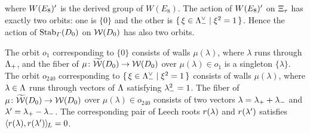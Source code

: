 \documentclass{amsart} %
\begin{document}
where $W(E_8)^{\prime}$ is the derived group of $W(E_8)$.
The action of $W(E_8)^{\prime}$ on $\Xi_{\tau}$ has exactly two orbits:
one is 
$\{0\}$ and the other is $\{\,{\xi\in \Lambda_{-}^{\vee}}\mid {\xi^2=1} \,\}$.
Hence the action of $\operatorname{Stab}_{\varGamma}(D_0)$ on $\mathord{\mathcal{W}}(D_0)$ 
has also two orbits.
\par
The orbit $o_1$ corresponding to $\{0\}$
consists of walls $\mu(\lambda)$,
where $\lambda$ runs through $\Lambda_{+}$,
and the fiber of $\mu\colon \widetilde{\mathord{\mathcal{W}}}(D_0)\to\mathord{\mathcal{W}}(D_0)$ 
over $\mu(\lambda)\in o_1$ is a singleton $\{\lambda\}$.
The orbit $o_{240}$ corresponding to $\{\,{\xi\in \Lambda_{-}^{\vee}}\mid {\xi^2=1} \,\}$
consists of walls $\mu(\lambda)$,
where $\lambda\in \Lambda$ runs through
vectors of $\Lambda$ satisfying ${\lambda}_{-}^2=1$.
The fiber of $\mu\colon \widetilde{\mathord{\mathcal{W}}}(D_0)\to\mathord{\mathcal{W}}(D_0)$ 
over $\mu(\lambda)\in o_{240}$ consists 
of two vectors
$\lambda={\lambda}_{+}+{\lambda}_{-}$ and $\lambda^{\prime}={\lambda}_{+}-{\lambda}_{-}$.
The corresponding pair of Leech roots 
$r(\lambda)$ and $r(\lambda^{\prime})$ satisfies
$\langle r(\lambda), r(\lambda^{\prime}) \rangle_{\hskip -1pt L}=0$.
%
%
\end{document}
